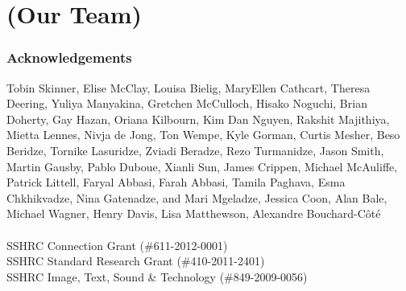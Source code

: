 \documentclass{beamer}
\begin{document}
\section*{(Our Team)}

\begin{frame}
\frametitle{Acknowledgements}

\small
Tobin Skinner, Elise McClay, Louisa Bielig, MaryEllen Cathcart, Theresa
Deering, Yuliya Manyakina, Gretchen McCulloch, Hisako Noguchi, Brian Doherty,
Gay Hazan, Oriana Kilbourn, Kim Dan Nguyen, Rakshit Majithiya, Mietta Lennes,
Nivja de Jong, Ton Wempe, Kyle Gorman, Curtis Mesher, Beso Beridze, Tornike
Lasuridze, Zviadi Beradze, Rezo Turmanidze, Jason Smith, Martin Gausby, Pablo
Duboue, Xianli Sun, James Crippen, Michael McAuliffe, Patrick Littell, Faryal
Abbasi, Farah Abbasi, Tamila Paghava, Esma Chkhikvadze, Nina Gatenadze, and
Mari Mgeladze, Jessica Coon, Alan Bale, Michael Wagner, Henry Davis, Lisa
Matthewson, Alexandre Bouchard-Côté
~\\
~\\
SSHRC Connection Grant (\#611-2012-0001) \\
SSHRC Standard Research Grant (\#410-2011-2401) \\
SSHRC Image, Text, Sound \& Technology (\#849-2009-0056)
\normalsize
{}

\end{frame}
\end{document}
